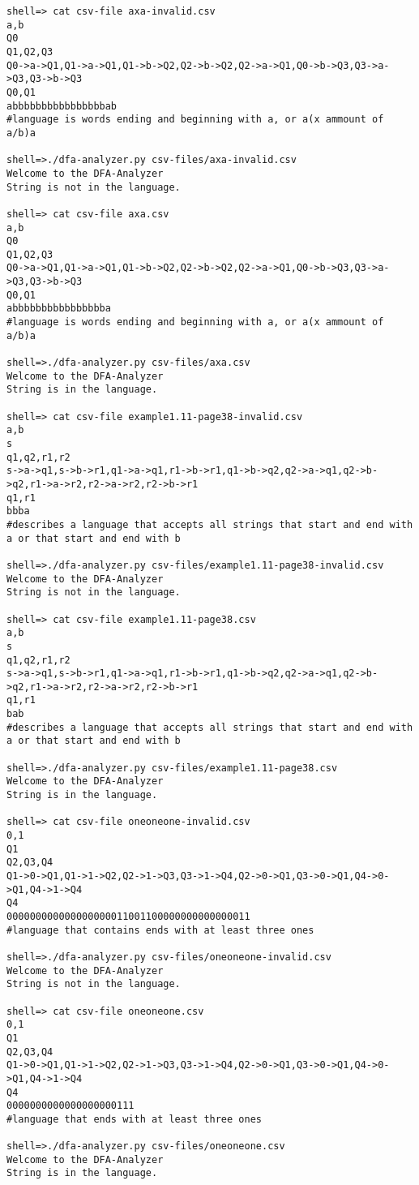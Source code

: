 \documentclass{article}
\begin{document}
\begin{lstlisting}
shell=> cat csv-file axa-invalid.csv
a,b
Q0
Q1,Q2,Q3
Q0->a->Q1,Q1->a->Q1,Q1->b->Q2,Q2->b->Q2,Q2->a->Q1,Q0->b->Q3,Q3->a->Q3,Q3->b->Q3
Q0,Q1
abbbbbbbbbbbbbbbbab
#language is words ending and beginning with a, or a(x ammount of a/b)a

shell=>./dfa-analyzer.py csv-files/axa-invalid.csv
Welcome to the DFA-Analyzer
String is not in the language.

shell=> cat csv-file axa.csv
a,b
Q0
Q1,Q2,Q3
Q0->a->Q1,Q1->a->Q1,Q1->b->Q2,Q2->b->Q2,Q2->a->Q1,Q0->b->Q3,Q3->a->Q3,Q3->b->Q3
Q0,Q1
abbbbbbbbbbbbbbbba
#language is words ending and beginning with a, or a(x ammount of a/b)a

shell=>./dfa-analyzer.py csv-files/axa.csv
Welcome to the DFA-Analyzer
String is in the language.

shell=> cat csv-file example1.11-page38-invalid.csv
a,b
s
q1,q2,r1,r2
s->a->q1,s->b->r1,q1->a->q1,r1->b->r1,q1->b->q2,q2->a->q1,q2->b->q2,r1->a->r2,r2->a->r2,r2->b->r1
q1,r1
bbba
#describes a language that accepts all strings that start and end with a or that start and end with b

shell=>./dfa-analyzer.py csv-files/example1.11-page38-invalid.csv
Welcome to the DFA-Analyzer
String is not in the language.

shell=> cat csv-file example1.11-page38.csv
a,b
s
q1,q2,r1,r2
s->a->q1,s->b->r1,q1->a->q1,r1->b->r1,q1->b->q2,q2->a->q1,q2->b->q2,r1->a->r2,r2->a->r2,r2->b->r1
q1,r1
bab
#describes a language that accepts all strings that start and end with a or that start and end with b

shell=>./dfa-analyzer.py csv-files/example1.11-page38.csv
Welcome to the DFA-Analyzer
String is in the language.

shell=> cat csv-file oneoneone-invalid.csv
0,1
Q1
Q2,Q3,Q4
Q1->0->Q1,Q1->1->Q2,Q2->1->Q3,Q3->1->Q4,Q2->0->Q1,Q3->0->Q1,Q4->0->Q1,Q4->1->Q4
Q4
000000000000000000011001100000000000000011
#language that contains ends with at least three ones

shell=>./dfa-analyzer.py csv-files/oneoneone-invalid.csv
Welcome to the DFA-Analyzer
String is not in the language.

shell=> cat csv-file oneoneone.csv
0,1
Q1
Q2,Q3,Q4
Q1->0->Q1,Q1->1->Q2,Q2->1->Q3,Q3->1->Q4,Q2->0->Q1,Q3->0->Q1,Q4->0->Q1,Q4->1->Q4
Q4
0000000000000000000111
#language that ends with at least three ones

shell=>./dfa-analyzer.py csv-files/oneoneone.csv
Welcome to the DFA-Analyzer
String is in the language.


\end{lstlisting}
\end{document}
